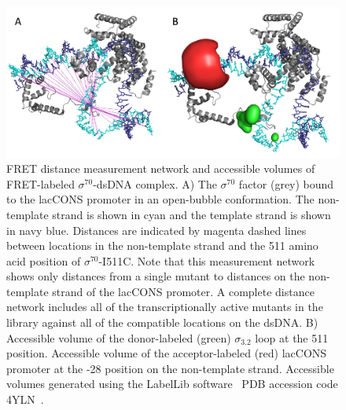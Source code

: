 \begin{figure}
    \centering
    \includegraphics[width=\textwidth]{chapters/figures/distance_network.jpg}
    \caption{\label{fig:distance_network} 
    FRET distance measurement network and accessible volumes of FRET-labeled $\sigma^{70}$-\ac{dsDNA} complex.
    A) The $\sigma^{70}$ factor (grey) bound to the \ac{lacCONS} promoter in an open-bubble conformation.
    The non-template strand is shown in cyan and the template strand is shown in navy blue. 
    Distances are indicated by magenta dashed lines between locations in the non-template strand and the 511 amino acid position of $\sigma^{70}$-I511C.  
    Note that this measurement network shows only distances from a single mutant to distances on the non-template strand of the \ac{lacCONS} promoter.
    A complete distance network includes all of the transcriptionally active mutants in the library against all of the compatible locations on the \ac{dsDNA}.
    B) Accessible volume of the donor-labeled (green) $\sigma_{3.2}$ loop at the 511 position.
    Accessible volume of the acceptor-labeled (red) \ac{lacCONS} promoter at the -28 position on the non-template strand. 
    Accessible volumes generated using the LabelLib software~\cite{dimura_NatComm_2020}
    PDB accession code 4YLN~\cite{zuo_steitz_2015}.
    }
\end{figure}

